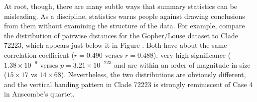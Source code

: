 At root, though, there are many subtle ways that summary statistics can be misleading. As a discipline, statistics warns people against drawing conclusions from them without examining the structure of the data. \cite{anscombe1973graphs} For example, compare the distribution of pairwise distances for the Gopher/Louse dataset \cite{hafner1994disparate} to Clade 72223, which appears just below it in Figure \cite{FP_highcorr}. Both have about the same correlation coefficient ($r=0.490$ verses $r=0.488$), very high significance ($1.38\times 10^{-9}$ verses $p=3.21\times 10^{-223}$ and are within an order of magnitude in size ($15 \times 17$ vs $14 \times 68$). Nevertheless, the two distributions are obviously different, and the vertical banding pattern in Clade 72223 is strongly reminiscent of Case 4 in Anscombe's quartet. 






